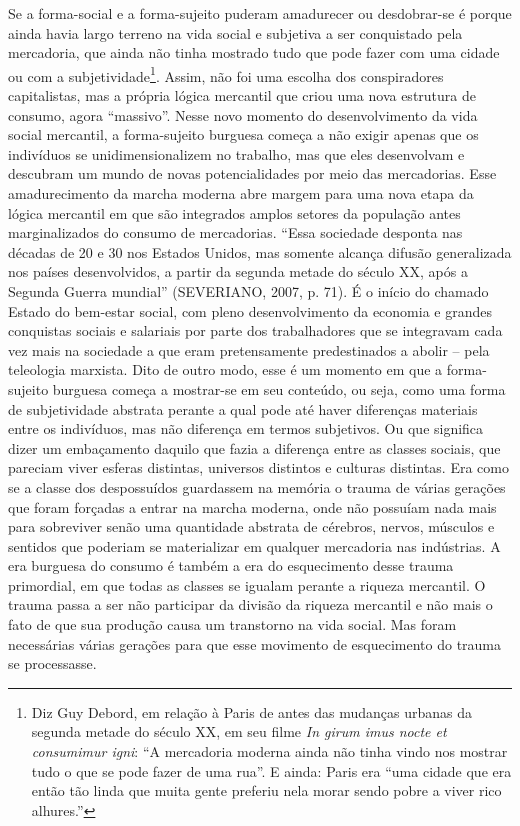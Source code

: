 Se a forma-social e a forma-sujeito puderam amadurecer ou desdobrar-se é
porque ainda havia largo terreno na vida social e subjetiva a ser
conquistado pela mercadoria, que ainda não tinha mostrado tudo que pode
fazer com uma cidade ou com a subjetividade\footnote{Diz Guy Debord, em
  relação à Paris de antes das mudanças urbanas da segunda metade do
  século XX, em seu filme \emph{In girum imus nocte et consumimur igni}:
  ``A mercadoria moderna ainda não tinha vindo nos mostrar tudo o que se
  pode fazer de uma rua''. E ainda: Paris era ``uma cidade que era então
  tão linda que muita gente preferiu nela morar sendo pobre a viver rico
  alhures.''}. Assim, não foi uma escolha dos conspiradores
capitalistas, mas a própria lógica mercantil que criou uma nova
estrutura de consumo, agora ``massivo''. Nesse novo momento do
desenvolvimento da vida social mercantil, a forma-sujeito burguesa
começa a não exigir apenas que os indivíduos se unidimensionalizem no
trabalho, mas que eles desenvolvam e descubram um mundo de novas
potencialidades por meio das mercadorias. Esse amadurecimento da marcha
moderna abre margem para uma nova etapa da lógica mercantil em que são
integrados amplos setores da população antes marginalizados do consumo
de mercadorias. ``Essa sociedade desponta nas décadas de 20 e 30 nos
Estados Unidos, mas somente alcança difusão generalizada nos países
desenvolvidos, a partir da segunda metade do século XX, após a Segunda
Guerra mundial'' (SEVERIANO, 2007, p. 71). É o início do chamado Estado
do bem-estar social, com pleno desenvolvimento da economia e grandes
conquistas sociais e salariais por parte dos trabalhadores que se
integravam cada vez mais na sociedade a que eram pretensamente
predestinados a abolir -- pela teleologia marxista. Dito de outro modo,
esse é um momento em que a forma-sujeito burguesa começa a mostrar-se em
seu conteúdo, ou seja, como uma forma de subjetividade abstrata perante
a qual pode até haver diferenças materiais entre os indivíduos, mas não
diferença em termos subjetivos. Ou que significa dizer um embaçamento
daquilo que fazia a diferença entre as classes sociais, que pareciam
viver esferas distintas, universos distintos e culturas distintas. Era
como se a classe dos despossuídos guardassem na memória o trauma de
várias gerações que foram forçadas a entrar na marcha moderna, onde não
possuíam nada mais para sobreviver senão uma quantidade abstrata de
cérebros, nervos, músculos e sentidos que poderiam se materializar em
qualquer mercadoria nas indústrias. A era burguesa do consumo é também a
era do esquecimento desse trauma primordial, em que todas as classes se
igualam perante a riqueza mercantil. O trauma passa a ser não participar
da divisão da riqueza mercantil e não mais o fato de que sua produção
causa um transtorno na vida social. Mas foram necessárias várias
gerações para que esse movimento de esquecimento do trauma se
processasse.

